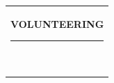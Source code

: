 \documentclass[10pt,A4]{article}
\newcommand{\mpwidth}{\linewidth-\fboxsep-\fboxsep}
\newcommand{\cvlist}[1] {
	\begin{itemize}{#1}\end{itemize}
}
\newcommand{\cvtext}[1] {
	\begin{tabular*}{1\mpwidth}{p{1\mpwidth}}
		\parbox{1\mpwidth}{#1}
	\end{tabular*}
}
\newcommand{\cvsection}[1] {
	\vspace{14pt}
	\cvtext{
		\textbf{\huge{\textcolor{darkcol}{\uppercase{#1}}}}\\[-4pt]
		\textcolor{maincol}{ \rule{0.1\textwidth}{2pt} } \\
	}
}
\newcommand{\cvevent}[7] {
	
	\parbox{\mpwidth}{
		\begin{tabular*}{1\mpwidth}{p{0.72\mpwidth}  r}
	 		\textcolor{black}{\Large\textbf{#2}} & \colorbox{maincol}{\makebox[0.25\mpwidth]{\textcolor{white}{#1}}} \\
			\textcolor{maincol}{\textbf{#3}} & \\
		\end{tabular*}\\[8pt]
	
		\ifthenelse{\isempty{#4}}{}{
			\cvtext{#4}
		}
	}

	\ifthenelse{\isempty{#5}}{}{
		\vspace{1pt} %
		{#5}
	}

	\ifthenelse{\isempty{#7}}{}{
		\vspace{1pt} %
		\cvtext{\textbf{Results:}}
		{#7}
	}

	\ifthenelse{\isempty{#6}}{}{
		\vspace{1pt} %
		\cvtext{\textbf{Involved technologies:}}
		{#6}
	}
	\vspace{14pt}
}
\begin{document}
\begin{paracol}{2}
\begin{rightcolumn}
	
	
	
	

	
\cvsection{VOLUNTEERING}


\end{rightcolumn}
\end{paracol}
\end{document}
